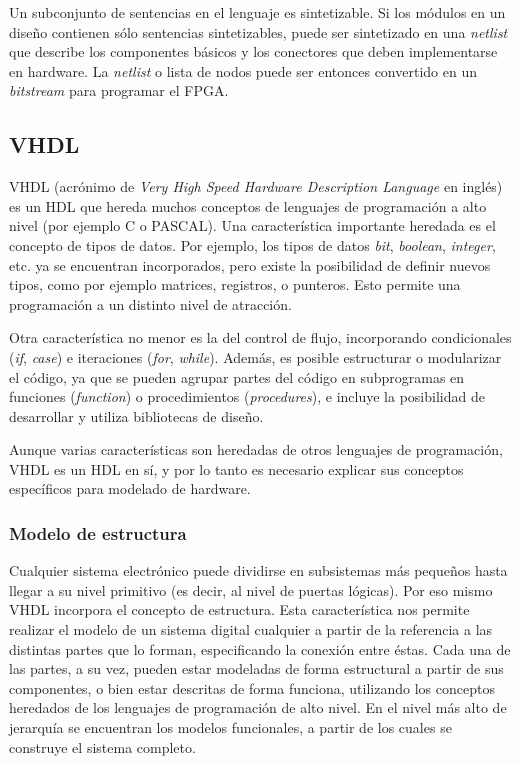 Un subconjunto de sentencias en el lenguaje es sintetizable. Si los módulos en un diseño contienen sólo sentencias sintetizables, puede ser sintetizado en una \emph{netlist} que describe los componentes básicos y los conectores que deben implementarse en hardware. La \emph{netlist} o lista de nodos puede ser entonces convertido en un \emph{bitstream} para programar el FPGA.

\subsection{VHDL}

VHDL (acrónimo de \emph{Very High Speed Hardware Description Language} en inglés) es un HDL que hereda muchos conceptos de lenguajes de programación a alto nivel (por ejemplo C o PASCAL). Una característica importante heredada es el concepto de tipos de datos. Por ejemplo, los tipos de datos \emph{bit}, \emph{boolean}, \emph{integer}, etc. ya se encuentran incorporados, pero existe la posibilidad de definir nuevos tipos, como por ejemplo matrices, registros, o punteros. Esto permite una programación a un distinto nivel de atracción.

Otra característica no menor es la del control de flujo, incorporando condicionales (\emph{if}, \emph{case}) e iteraciones (\emph{for}, \emph{while}). Además, es posible estructurar o modularizar el código, ya que se pueden agrupar partes del código en subprogramas en funciones (\emph{function}) o procedimientos (\emph{procedures}), e incluye la posibilidad de desarrollar y utiliza bibliotecas de diseño.

Aunque varias características son heredadas de otros lenguajes de programación, VHDL es un HDL en sí, y por lo tanto es necesario explicar sus conceptos específicos para modelado de hardware.

\subsubsection{Modelo de estructura}
\label{vhdl-estruct}

Cualquier sistema electrónico puede dividirse en subsistemas más pequeños hasta llegar a su nivel primitivo (es decir, al nivel de puertas lógicas). Por eso mismo VHDL incorpora el concepto de estructura. Esta característica nos permite realizar el modelo de un sistema digital cualquier a partir de la referencia a las distintas partes que lo forman, especificando la conexión entre éstas. Cada una de las partes, a su vez, pueden estar modeladas de forma estructural a partir de sus componentes, o bien estar descritas de forma funciona, utilizando los conceptos heredados de los lenguajes de programación de alto nivel. En el nivel más alto de jerarquía se encuentran los modelos funcionales, a partir de los cuales se construye el sistema completo.

